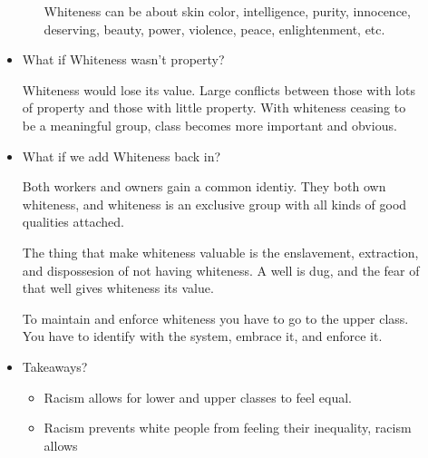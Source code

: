 \documentclass{report}
\begin{document}
\begin{description}
\begin{itemize}
\begin{itemize}
\begin{mdframed}
                            Whiteness can be about skin color,
                            intelligence, purity, innocence,
                            deserving, beauty, power, violence,
                            peace, enlightenment, etc.
                        \end{mdframed}
                \end{itemize}
            \item What if Whiteness wasn't property?
                \begin{mdframed}
                    Whiteness would lose its value.
                    Large conflicts between those with
                    lots of property and those with little
                    property. With whiteness ceasing to be
                    a meaningful group, class becomes more
                    important and obvious.
                \end{mdframed}
            \item What if we add Whiteness back in?
                \begin{mdframed}
                   Both workers and owners gain a common
                   identiy. They both own whiteness, and whiteness
                   is an exclusive group with all kinds of good
                   qualities attached.
                \end{mdframed}
                \begin{mdframed}
                    The thing that make whiteness valuable is
                    the enslavement, extraction, and dispossesion
                    of not having whiteness. A well is dug, and
                    the fear of that well gives whiteness its
                    value.
                \end{mdframed}
                \begin{mdframed}
                    To maintain and enforce whiteness you have
                    to go to the upper class. You have to 
                    identify with the system, embrace it,
                    and enforce it.
                \end{mdframed}
            \item Takeaways?
                \begin{itemize}
                    \item Racism allows for lower and upper 
                        classes to feel equal.
                    \item Racism prevents white people from
                        feeling their inequality, racism allows

\end{itemize}
\end{itemize}
\end{description}
\end{document}
